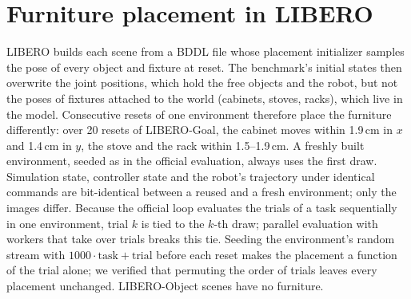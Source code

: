\section{Furniture placement in LIBERO}
\label{sec:supp:furniture}

LIBERO builds each scene from a BDDL file whose placement initializer samples the pose of every object and fixture at
reset. The benchmark's initial states then overwrite the joint positions, which hold the free objects and the robot, but
not the poses of fixtures attached to the world (cabinets, stoves, racks), which live in the model. Consecutive resets of one
environment therefore place the furniture differently: over 20 resets of LIBERO-Goal, the cabinet moves within 1.9\,cm in
$x$ and 1.4\,cm in $y$, the stove and the rack within 1.5--1.9\,cm. A freshly built environment, seeded as in the official
evaluation, always uses the first draw. Simulation state, controller state and the robot's trajectory under identical
commands are bit-identical between a reused and a fresh environment; only the images differ. Because the official loop
evaluates the trials of a task sequentially in one environment, trial $k$ is tied to the $k$-th draw; parallel evaluation
with workers that take over trials breaks this tie. Seeding the environment's random stream with $1000\cdot\text{task} +
\text{trial}$ before each reset makes the placement a function of the trial alone; we verified that permuting the order of
trials leaves every placement unchanged. LIBERO-Object scenes have no furniture.
